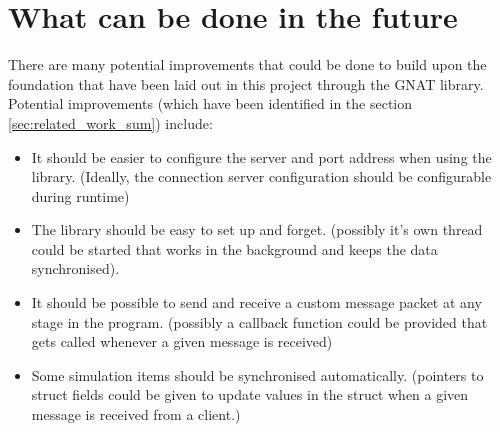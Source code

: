 \section{What can be done in the future}
There are many potential improvements that could be done to build upon the foundation that have been laid out in this project through the GNAT library. Potential improvements (which have been identified in the section \ref{sec:related_work_sum}) include:
\begin{itemize}
\item It should be easier to configure the server and port address when using the library. (Ideally, the connection server configuration should be configurable during runtime)
\item The library should be easy to set up and forget. (possibly it's own thread could be started that works in the background and keeps the data synchronised).
\item It should be possible to send and receive a custom message packet at any stage in the program. (possibly a callback function could be provided that gets called whenever a given message is received)
\item Some simulation items should be synchronised automatically. (pointers to struct fields could be given to update values in the struct when a given message is received from a client.)
\end{itemize}
